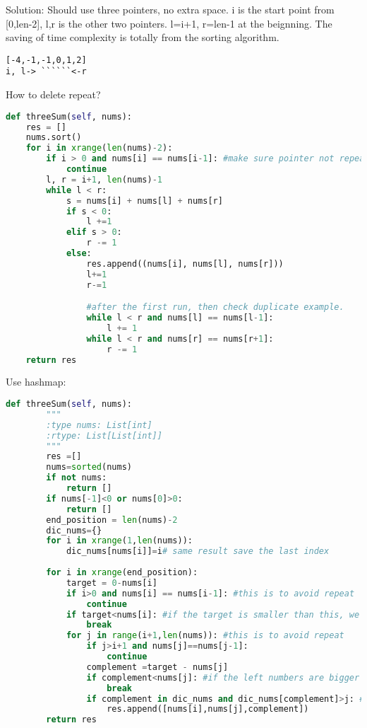 \documentclass[../main.tex]{subfiles}
\begin{document}
Solution: Should use three pointers, no extra space. i is the start point from [0,len-2], l,r is the other two pointers. l=i+1, r=len-1 at the beignning. The saving of time complexity is totally from the sorting algorithm.
\begin{lstlisting}
[-4,-1,-1,0,1,2]
i, l-> ``````<-r
\end{lstlisting}
How to delete repeat?
\begin{lstlisting}[language = Python]
def threeSum(self, nums):
    res = []
    nums.sort()
    for i in xrange(len(nums)-2):
        if i > 0 and nums[i] == nums[i-1]: #make sure pointer not repeat
            continue
        l, r = i+1, len(nums)-1
        while l < r:
            s = nums[i] + nums[l] + nums[r]
            if s < 0:
                l +=1 
            elif s > 0:
                r -= 1
            else:
                res.append((nums[i], nums[l], nums[r]))
                l+=1
                r-=1

                #after the first run, then check duplicate example.
                while l < r and nums[l] == nums[l-1]:
                    l += 1
                while l < r and nums[r] == nums[r+1]:
                    r -= 1
    return res
\end{lstlisting}
Use hashmap:
\begin{lstlisting}[language = Python]
def threeSum(self, nums):
        """
        :type nums: List[int]
        :rtype: List[List[int]]
        """
        res =[]
        nums=sorted(nums)
        if not nums:
            return []
        if nums[-1]<0 or nums[0]>0:
            return []
        end_position = len(nums)-2
        dic_nums={}
        for i in xrange(1,len(nums)):
            dic_nums[nums[i]]=i# same result save the last index
        
        for i in xrange(end_position):
            target = 0-nums[i]
            if i>0 and nums[i] == nums[i-1]: #this is to avoid repeat 
                continue
            if target<nums[i]: #if the target is smaller than this, we can not find them on the right side
                break
            for j in range(i+1,len(nums)): #this is to avoid repeat 
                if j>i+1 and nums[j]==nums[j-1]:
                    continue
                complement =target - nums[j]
                if complement<nums[j]: #if the left numbers are bigger than the complement, no need to keep searching
                    break
                if complement in dic_nums and dic_nums[complement]>j: #need to make sure the complement is bigger than nums[j]
                    res.append([nums[i],nums[j],complement])
        return res
\end{lstlisting}
\end{document}
